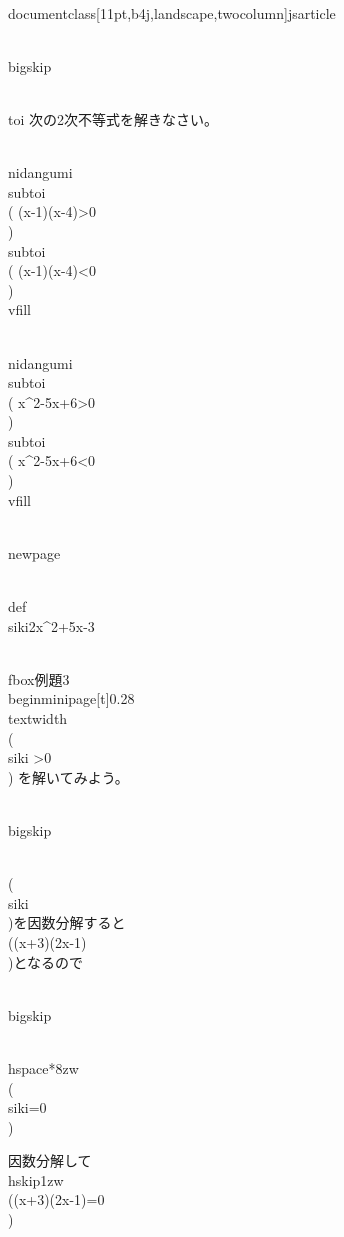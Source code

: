 \\documentclass[11pt,b4j,landscape,twocolumn]{jsarticle}
\begin{document}
\\bigskip


\\toi 次の2次不等式を解きなさい。

\\nidangumi{\\subtoi \\( (x-1)(x-4)>0 \\) }
			{\\subtoi  \\(  (x-1)(x-4)<0  \\) }\\vfill

\\nidangumi{\\subtoi \\( x^2-5x+6>0 \\) }
			{\\subtoi  \\(  x^2-5x+6<0  \\) }\\vfill


\\newpage

\\def\\siki{2x^2+5x-3}

\\fbox{例題3}　
\\begin{minipage}[t]{0.28\\textwidth}
　\\( \\siki >0\\) を解いてみよう。

\\bigskip

\\(\\siki\\)を因数分解すると\\((x+3)(2x-1)\\)となるので

\\bigskip

\\hspace*{8zw}\\(\\siki=0\\)

因数分解して\\hskip1zw \\((x+3)(2x-1)=0\\)
\end{document}
